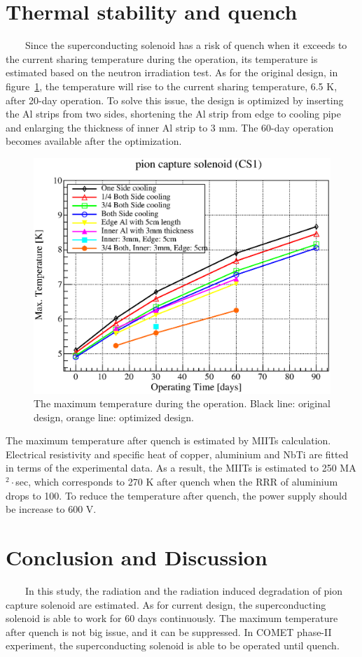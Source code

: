 \documentclass[a4paper, 10pt, twocolumn]{article}
\begin{document}
\section{Thermal stability and quench}
~~~~Since the superconducting solenoid has a risk of quench when it exceeds to the current sharing temperature during the operation, its temperature is estimated based on the neutron irradiation test.
As for the original design, in figure~\ref{temp}, the temperature will rise to the current sharing temperature, 6.5 K, after 20-day operation.
To solve this issue, the design is optimized by inserting the Al strips from two sides, shortening the Al strip from edge to cooling pipe and enlarging the thickness of inner Al strip to 3 mm.
The 60-day operation becomes available after the optimization.
\begin{figure}[H]
 \centering
 \includegraphics[scale=0.4]{fig/maxtemp.eps}
 \caption{The maximum temperature during the operation. Black line: original design, orange line: optimized design.}
 \label{temp}
\end{figure}

The maximum temperature after quench is estimated by MIITs calculation.
Electrical resistivity and specific heat of copper, aluminium and NbTi are fitted in terms of the experimental data.
As a result, the MIITs is estimated to 250 MA$^2\cdot$sec, which corresponds to 270 K after quench when the RRR of aluminium drops to 100.
To reduce the temperature after quench, the power supply should be increase to 600 V.

\section{Conclusion and Discussion}
~~~~In this study, the radiation and the radiation induced degradation of pion capture solenoid are estimated.
As for current design, the superconducting solenoid is able to work for 60 days continuously.
The maximum temperature after quench is not big issue, and it can be suppressed.
In COMET phase-II experiment, the superconducting solenoid is able to be operated until quench.
\end{document}
